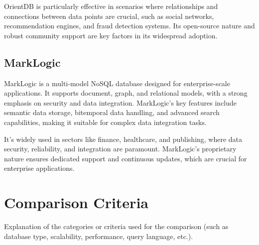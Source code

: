 \documentclass[a3paper,11pt]{extarticle}
\begin{document}
OrientDB is particularly effective in scenarios where relationships and connections between data points are crucial, such as social networks, recommendation engines, and fraud detection systems. Its open-source nature and robust community support are key factors in its widespread adoption.

\subsection*{MarkLogic}
MarkLogic is a multi-model NoSQL database designed for enterprise-scale applications. It supports document, graph, and relational models, with a strong emphasis on security and data integration. MarkLogic's key features include semantic data storage, bitemporal data handling, and advanced search capabilities, making it suitable for complex data integration tasks.

It's widely used in sectors like finance, healthcare, and publishing, where data security, reliability, and integration are paramount. MarkLogic's proprietary nature ensures dedicated support and continuous updates, which are crucial for enterprise applications.

\newpage


\section*{Comparison Criteria}
Explanation of the categories or criteria used for the comparison (such as database type, scalability, performance, query language, etc.).
\newpage
\end{document}
